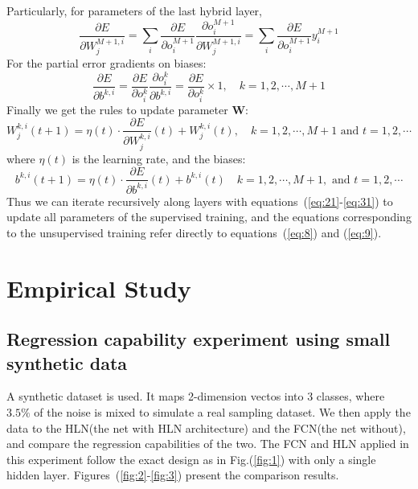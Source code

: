 \documentclass[3p,times,procedia]{elsarticle}
\begin{document}
Particularly, for parameters of the last 
hybrid layer,
\begin{equation}
	\frac{\partial E}
	{\partial W_j^{M+1,i}}=\sum_i
	\frac{\partial E}
	{\partial o_i^{M+1}}
	\frac{\partial o_i^{M+1}}
	{\partial W_j^{M+1,i}}=\sum_i
	\frac{\partial E}
	{\partial o_i^{M+1}}
	y_i^{M+1}
	\label{eq:28}
\end{equation}
For the partial error gradients on biases:
\begin{equation}
	\frac{\partial E}
	{\partial b^{k,i}}=
	\frac{\partial E}
	{\partial o_i^k}
	\frac{\partial o_i^k}
	{\partial b^{k,i}}=
	\frac{\partial E}
	{\partial o_i^k}
	\times 1,
	\quad k=1,2,\cdots,M+1
	\label{eq:29}
\end{equation}
Finally we get the rules to update parameter
$\mathbf{W}$:
\begin{equation}
	W_j^{k,i}(t+1) = \eta(t)\cdot
	\frac{\partial E}{\partial W_j^{k,i}}(t)+
	W_j^{k,i}(t),
	\quad k=1,2,\cdots,M+1
	\text{ and }
	t=1,2,\cdots
	\label{eq:30}
\end{equation}
where $\eta(t)$ is the learning rate, and 
the biases:
\begin{equation}
	b^{k,i}(t+1) = \eta(t)\cdot
	\frac{\partial E}{\partial b^{k,i}}(t)+
	b^{k,i}(t)
	\quad k=1,2,\cdots,M+1,
	\text{ and }
	t=1,2,\cdots
	\label{eq:31}
\end{equation}
Thus we can iterate recursively along 
layers with 
equations~(\ref{eq:21}-\ref{eq:31}) to 
update all parameters of the supervised 
training, and the equations corresponding 
to the unsupervised training refer 
directly to equations~(\ref{eq:8}) and 
(\ref{eq:9}).

\section{Empirical Study}
\subsection{Regression capability
experiment using small synthetic data}
A synthetic dataset is used. It maps
2-dimension vectos into 3 classes, where
$3.5\%$ of the noise is mixed to simulate 
a real sampling dataset.
We then apply the data to the HLN(the 
net with HLN architecture) and the 
FCN(the net without),
and compare the regression capabilities 
of the two. 
The FCN and HLN applied in this 
experiment follow the exact design as 
in Fig.(\ref{fig:1}) with only a single 
hidden layer.
Figures~(\ref{fig:2}-\ref{fig:3}) 
present the comparison results.
\end{document}
